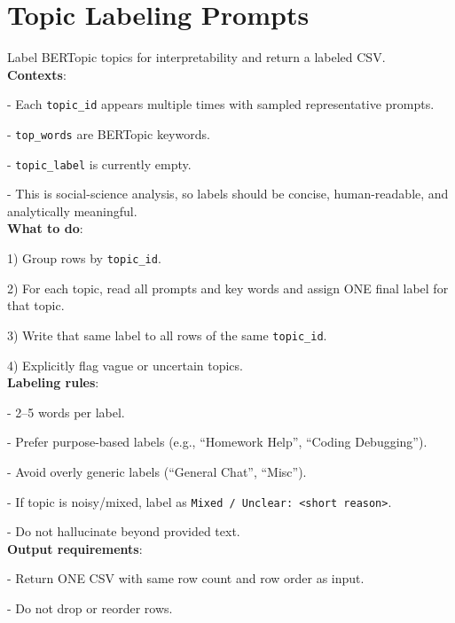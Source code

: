 \documentclass[11pt]{article}
\begin{document}
\section{Topic Labeling Prompts}
\label{sec:appendix-topic-labeling}
\begin{tcolorbox}[
  enhanced jigsaw,
  colback=gray!5,
  colframe=gray!40,
  title=Prompt for Topic Labeling,
  boxsep=3pt,
  left=3pt,
  right=3pt,
  top=3pt,
  bottom=3pt,
  parskip=0pt,
  breakable,
  break at=-\baselineskip/0pt,
  height fixed for=middle,
  pad at break=1mm
]

Label BERTopic topics for interpretability and return a labeled CSV.\\

\textbf{Contexts}:

- Each \texttt{topic\_id} appears multiple times with sampled representative prompts.

- \texttt{top\_words} are BERTopic keywords.

- \texttt{topic\_label} is currently empty.

- This is social-science analysis, so labels should be concise, human-readable, and analytically meaningful.\\

\textbf{What to do}:

1) Group rows by \texttt{topic\_id}.

2) For each topic, read all prompts and key words and assign ONE final label for that topic.

3) Write that same label to all rows of the same \texttt{topic\_id}.

4) Explicitly flag vague or uncertain topics.\\

\textbf{Labeling rules}:

- 2–5 words per label.

- Prefer purpose-based labels (e.g., ``Homework Help'', ``Coding Debugging'').

- Avoid overly generic labels (``General Chat'', ``Misc'').

- If topic is noisy/mixed, label as \texttt{Mixed / Unclear: <short reason>}.

- Do not hallucinate beyond provided text.\\

\textbf{Output requirements}:

- Return ONE CSV with same row count and row order as input.

- Do not drop or reorder rows.


\end{tcolorbox}
\end{document}
